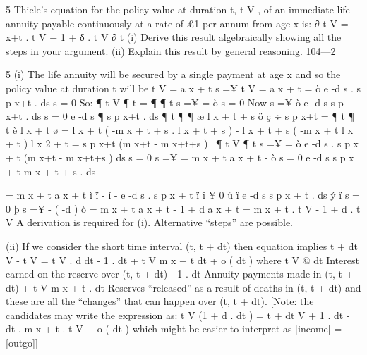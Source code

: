 \documentclass[a4paper,12pt]{article}
\begin{document}
5
Thiele’s equation for the policy value at duration t, t V , of an immediate life
annuity payable continuously at a rate of £1 per annum from age x is:
∂
t V = \mu x+t . t V − 1 + δ . t V
∂ t
(i) Derive this result algebraically showing all the steps in your
argument.
(ii) Explain this result by general reasoning.
104—2




5
(i)
The life annuity will be secured by a single payment at age x and so the
policy value at duration t will be
t V
= a x + t
s =¥
t V
= a x + t =
ò
e -d s . s p x+t . ds
s = 0
So:
¶
t V
¶ t
=
¶
¶ t
s =¥
=
ò
s = 0
Now
s =¥
ò
e -d s s p x+t . ds
s = 0
e -d s
¶
s p x+t . ds
¶ t
¶
¶ æ l x + t + s ö
ç
÷
s p x+t =
¶ t
¶ t è l x + t ø
=
l x + t ( -m x + t + s . l x + t + s ) - l x + t + s ( -m x + t l x + t )
l x 2 + t
= s p x+t (m x+t - m x+t+s )
\
¶
t V
¶ t
s =¥
=
ò
e -d s . s p x + t (m x+t - m x+t+s ) ds
s = 0
s =¥
= m x + t a x + t -
ò
s = 0
e -d s s p x + t m x + t + s . ds

= m x + t a x + t
ì
ï
- í - e -d s . s p x + t
ï
î
¥
0
ü
ï
e -d s s p x + t . ds ý
ï
s = 0
þ
s =¥
- ( -d )
ò
= m x + t a x + t - 1 + d a x + t
= m x + t . t V - 1 + d . t V
A derivation is required for (i). Alternative “steps” are possible.


(ii)
If we consider the short time interval (t, t + dt) then equation implies
t + dt V
- t V = t V . d dt - 1 . dt + t V m x + t dt + o ( dt )
where
t V @ dt Interest earned on the reserve over (t, t + dt)
- 1 . dt Annuity payments made in (t, t + dt)
+ t V m x + t . dt Reserves “released” as a result of deaths
in (t, t + dt)
and these are all the “changes” that can happen over (t, t + dt).
[Note: the candidates may write the expression as:
t V (1
+ d . dt ) =
t + dt V
+ 1 . dt - dt . m x + t . t V + o ( dt )
which might be easier to interpret as [income] = [outgo]]
\end{document}
